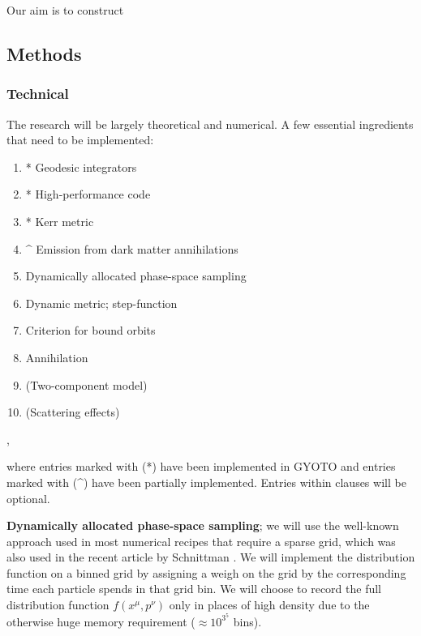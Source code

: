\documentclass[a4paper,10pt]{article}
\begin{document}
Our aim is to construct 


\subsection{Methods}


\subsubsection{Technical}

The research will be largely theoretical and numerical. A few essential ingredients that need to be implemented:

\begin{enumerate}
 \item * Geodesic integrators
 \item * High-performance code %
 \item * Kerr metric
 \item ^ Emission from dark matter annihilations
 \item Dynamically allocated phase-space sampling
 \item Dynamic metric; step-function
 \item Criterion for bound orbits
 \item Annihilation
 \item (Two-component model)
 \item (Scattering effects)
\end{enumerate},

where entries marked with (*) have been implemented in GYOTO \citep{gyoto_vincent_2011} and entries marked with (^) have been partially implemented. 
Entries within clauses will be optional.

\textbf{Dynamically allocated phase-space sampling}; we will use the well-known approach used in most numerical recipes that require 
a sparse grid, which was also used in the recent article by Schnittman \citep{schnittman2015}. %
We will implement the distribution function on a binned grid by assigning a weigh on the grid by the corresponding time each particle spends in 
that grid bin. We will choose to record the full distribution function $f(x^\mu,p^\nu)$ only in places of high density due to the otherwise 
huge memory requirement ($\approx 10^3^5$ bins).
\end{document}
